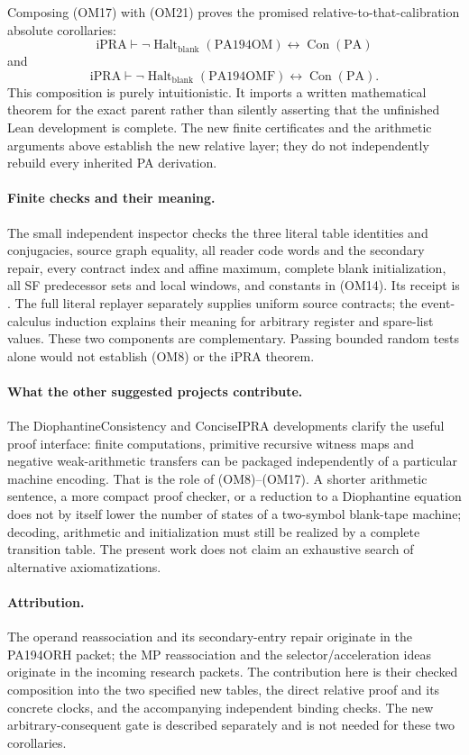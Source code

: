 Composing (OM17) with (OM21) proves the promised relative-to-that-calibration
absolute corollaries:
\[
 \boxed{\quad\mathrm{iPRA}\vdash
 \neg\operatorname{Halt}_{\mathrm{blank}}(\mathrm{PA194OM})
       \longleftrightarrow\operatorname{Con}(\mathrm{PA})\quad}
\]
and
\[
 \boxed{\quad\mathrm{iPRA}\vdash
 \neg\operatorname{Halt}_{\mathrm{blank}}(\mathrm{PA194OMF})
       \longleftrightarrow\operatorname{Con}(\mathrm{PA}).\quad}
\]
This composition is purely intuitionistic.  It imports a written
mathematical theorem for the exact parent rather than silently asserting
that the unfinished Lean development is complete.  The new finite
certificates and the arithmetic arguments above establish the new relative
layer; they do not independently rebuild every inherited PA derivation.

\paragraph{Finite checks and their meaning.}
The small independent inspector checks the three literal table identities
and conjugacies, source graph equality, all reader code words and the
secondary repair, every contract index and affine maximum, complete blank
initialization, all SF predecessor sets and local windows, and constants
in (OM14).  Its receipt is .
The full literal replayer separately supplies uniform source contracts;
the event-calculus induction explains their meaning for arbitrary register
and spare-list values.  These two components are complementary.  Passing
bounded random tests alone would not establish (OM8) or the iPRA theorem.

\paragraph{What the other suggested projects contribute.}
The DiophantineConsistency and ConciseIPRA developments clarify the useful
proof interface: finite computations, primitive recursive witness maps and
negative weak-arithmetic transfers can be packaged independently of a
particular machine encoding.  That is the role of (OM8)--(OM17).
A shorter arithmetic sentence, a more compact proof checker, or a reduction
to a Diophantine equation does not by itself lower the number of states of
a two-symbol blank-tape machine; decoding, arithmetic and initialization
must still be realized by a complete transition table.  The present work
does not claim an exhaustive search of alternative axiomatizations.

\paragraph{Attribution.}
The operand reassociation and its secondary-entry repair originate in the
PA194ORH packet; the MP reassociation and the selector/acceleration ideas
originate in the incoming research packets.  The contribution here is their
checked composition into the two specified new tables, the direct relative
proof and its concrete clocks, and the accompanying independent binding
checks.  The new arbitrary-consequent gate is described separately and is
not needed for these two corollaries.
